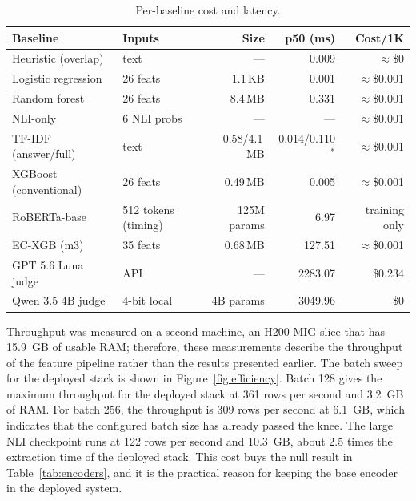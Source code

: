 \documentclass[a4paper,fleqn]{cas-sc}
\begin{document}
\begin{table}[pos=htbp]
  \centering
  \caption{Per-baseline cost and latency.}
  \label{tab:cost}
  \begin{tabular}{llrrr}
    \toprule
    \textbf{Baseline}      & \textbf{Inputs}     & \textbf{Size} & \textbf{p50 (ms)}  & \textbf{Cost/1K} \\
    \midrule
    Heuristic (overlap)    & text                & ---           & 0.009              & $\approx$\$0     \\
    Logistic regression    & 26 feats            & 1.1\,KB       & 0.001              & $\approx$\$0.001 \\
    Random forest          & 26 feats            & 8.4\,MB       & 0.331              & $\approx$\$0.001 \\
    NLI-only               & 6 NLI probs         & ---           & ---                & $\approx$\$0.001 \\
    TF-IDF (answer/full)   & text                & 0.58/4.1\,MB  & 0.014/0.110$^\ast$ & $\approx$\$0.001 \\
    XGBoost (conventional) & 26 feats            & 0.49\,MB      & 0.005              & $\approx$\$0.001 \\
    RoBERTa-base           & 512 tokens (timing) & 125M params   & 6.97               & training only    \\
    EC-XGB (m3)            & 35 feats            & 0.68\,MB      & 127.51             & $\approx$\$0.001 \\
    GPT 5.6 Luna judge     & API                 & ---           & 2283.07            & \$0.234          \\
    Qwen 3.5 4B judge      & 4-bit local         & 4B params     & 3049.96            & \$0              \\
    \bottomrule
  \end{tabular}
\end{table}

Throughput was measured on a second machine, an H200 MIG slice that has 15.9~GB of usable RAM; therefore, these measurements describe the throughput of the feature pipeline rather than the results presented earlier. The batch sweep for the deployed stack is shown in Figure~\ref{fig:efficiency}. Batch 128 gives the maximum throughput for the deployed stack at 361 rows per second and 3.2~GB of RAM. For batch 256, the throughput is 309 rows per second at 6.1~GB, which indicates that the configured batch size has already passed the knee. The large NLI checkpoint runs at 122 rows per second and 10.3~GB, about 2.5 times the extraction time of the deployed stack. This cost buys the null result in Table~\ref{tab:encoders}, and it is the practical reason for keeping the base encoder in the deployed system.
\end{document}
